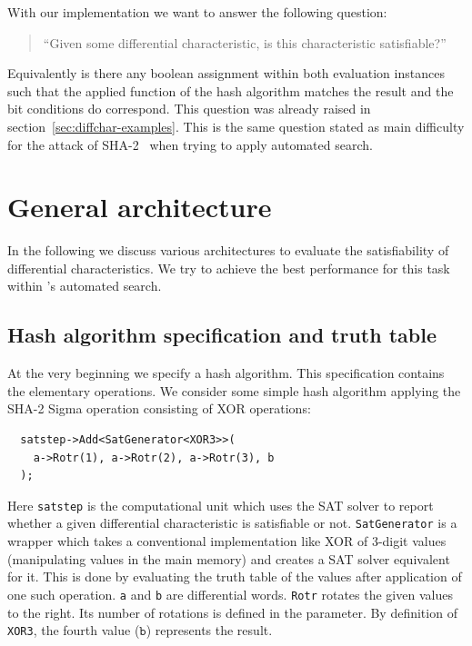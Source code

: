 With our implementation we want to answer the following question:
\begin{quote}
  ``Given some differential characteristic, is this characteristic satisfiable?''
\end{quote}
Equivalently is there any boolean assignment within both evaluation instances such that the applied function of the hash algorithm matches the result and the bit conditions do correspond. This question was already raised in section~\ref{sec:diffchar-examples}. This is the same question stated as main difficulty for the attack of SHA-2~\cite[293]{Cry07} when trying to apply automated search.

\section{General architecture}
\label{sec:architecture}
%
In the following we discuss various architectures to evaluate the satisfiability of differential characteristics. We try to achieve the best performance for this task within \nltool{}'s automated search.

\subsection{Hash algorithm specification and truth table}
%
At the very beginning we specify a hash algorithm. This specification contains the elementary operations. We consider some simple hash algorithm applying the SHA-2 Sigma operation consisting of XOR operations:
\begin{lstlisting}
  satstep->Add<SatGenerator<XOR3>>(
    a->Rotr(1), a->Rotr(2), a->Rotr(3), b
  );
\end{lstlisting}

Here \texttt{satstep} is the computational unit which uses the SAT solver to report whether a given differential characteristic is satisfiable or not. \texttt{SatGenerator} is a wrapper which takes a conventional implementation like XOR of 3-digit values (manipulating values in the main memory) and creates a SAT solver equivalent for it. This is done by evaluating the truth table of the values after application of one such operation. \texttt{a} and \texttt{b} are differential words. \texttt{Rotr} rotates the given values to the right. Its number of rotations is defined in the parameter. By definition of \texttt{XOR3}, the fourth value ($\texttt{b}$) represents the result.

